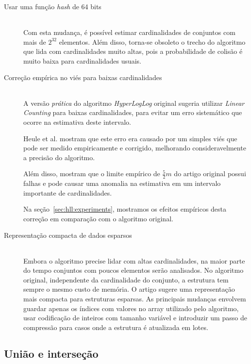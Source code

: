 \begin{description}
  \item[Usar uma função \emph{hash} de 64 bits] \hfill \\
    Com esta mudança, é possível estimar cardinalidades de conjuntos com mais de $2^{32}$ elementos. Além disso, torna-se obsoleto o trecho do algoritmo que lida com cardinalidades muito altas, pois a probabilidade de colisão é muito baixa para cardinalidades usuais. 
  
  \item[Correção empírica no viés para baixas cardinalidades] \hfill \\
    A versão \emph{prática} do algoritmo \emph{HyperLogLog} original sugeria utilizar \emph{Linear Counting} para baixas cardinalidades, para evitar um erro sistemático que ocorre na estimativa deste intervalo. 
    
    Heule et al. mostram que este erro era causado por um simples viés que pode ser medido empiricamente e corrigido, melhorando consideravelmente a precisão do algoritmo. 

    Além disso, mostram que o limite empírico de $\frac{5}{2}m$ do artigo original possui falhas e pode causar uma anomalia na estimativa em um intervalo importante de cardinalidades.
    
    Na seção~\ref{sec:hll:experiments}, mostramos os efeitos empíricos desta correção em comparação com o algoritmo original.

  \item[Representação compacta de dados esparsos] \hfill \\
    Embora o algoritmo precise lidar com altas cardinalidades, na maior parte do tempo conjuntos com poucos elementos serão analisados. No algoritmo original, independente da cardinalidade do conjunto, a estrutura tem sempre o mesmo custo de memória. O artigo sugere uma representação mais compacta para estruturas esparsas. As principais mudanças envolvem guardar apenas os índices com valores no array utilizado pelo algoritmo, usar codificação de inteiros com tamanho variável e introduzir um passo de compressão para casos onde a estrutura é atualizada em lotes.
    
\end{description}

\subsection{União e interseção}\label{sec:hll:intersection}

